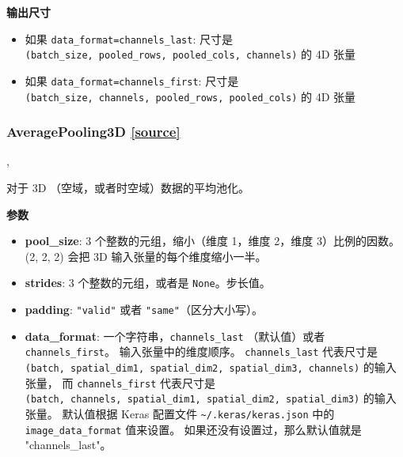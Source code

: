 \textbf{输出尺寸}

\begin{itemize}
\tightlist
\item
  如果
  \texttt{data\_format=\textquotesingle{}channels\_last\textquotesingle{}}:
  尺寸是 \texttt{(batch\_size,\ pooled\_rows,\ pooled\_cols,\ channels)}
  的 4D 张量
\item
  如果
  \texttt{data\_format=\textquotesingle{}channels\_first\textquotesingle{}}:
  尺寸是 \texttt{(batch\_size,\ channels,\ pooled\_rows,\ pooled\_cols)}
  的 4D 张量
\end{itemize}




\subsubsection{AveragePooling3D {\href{https://github.com/keras-team/keras/blob/master/keras/layers/pooling.py\#L389}{{[}source{]}}}}

\begin{Shaded}
\begin{Highlighting}[]
\OperatorTok{=}\NormalTok{(}\NormalTok{, }\NormalTok{, }\OperatorTok{=}\OperatorTok{=},\\
\hspace{4cm}\OperatorTok{=}\NormalTok{)}
\end{Highlighting}
\end{Shaded}

对于 3D （空域，或者时空域）数据的平均池化。

\textbf{参数}

\begin{itemize}
\tightlist
\item
  \textbf{pool\_size}: 3 个整数的元组，缩小（维度 1，维度 2，维度
  3）比例的因数。 (2, 2, 2) 会把 3D 输入张量的每个维度缩小一半。
\item
  \textbf{strides}: 3 个整数的元组，或者是 \texttt{None}。步长值。
\item
  \textbf{padding}: \texttt{"valid"} 或者
  \texttt{"same"}（区分大小写）。
\item
  \textbf{data\_format}: 一个字符串，\texttt{channels\_last}
  （默认值）或者 \texttt{channels\_first}。 输入张量中的维度顺序。
  \texttt{channels\_last} 代表尺寸是
  \texttt{(batch,\ spatial\_dim1,\ spatial\_dim2,\ spatial\_dim3,\ channels)}
  的输入张量， 而 \texttt{channels\_first} 代表尺寸是
  \texttt{(batch,\ channels,\ spatial\_dim1,\ spatial\_dim2,\ spatial\_dim3)}
  的输入张量。 默认值根据 Keras 配置文件
  \texttt{\textasciitilde{}/.keras/keras.json} 中的
  \texttt{image\_data\_format} 值来设置。
  如果还没有设置过，那么默认值就是 "channels\_last"。
\end{itemize}

